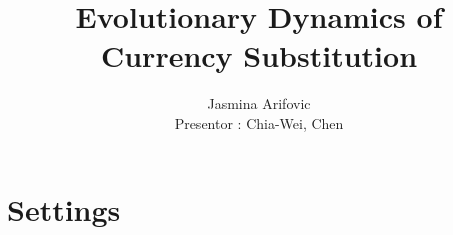 \documentclass[mathserif]{beamer}
\title{Evolutionary Dynamics of Currency Substitution}
\author{Jasmina Arifovic \\ {\small Presentor : Chia-Wei, Chen}}
\begin{document}
    \begin{frame}

        \maketitle

    \end{frame}

    \section{Settings}
    
\end{document}
